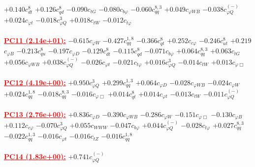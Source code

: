 \documentclass{article}
\begin{document}
{$+0.140$}{\rm $c_{dt}^{8}$} 
{$+0.126$}{\rm $c_{qd}^{8}$} 
{$-0.090$}{\rm $c_{tG}$} 
{$-0.080$}{\rm $c_{b \varphi}$} 
{$-0.060$}{\rm $c_{qq}^{8,3}$} 
{$+0.049$}{\rm $c_{\varphi WB}$} 
{$-0.038$}{\rm $c_{\varphi Q}^{(-)}$} 
{$+0.024$}{\rm $c_{\varphi t}$} 
{$-0.018$}{\rm $c_{\varphi Q}^{3}$} 
{$+0.018$}{\rm $c_{tW}$} 
{$-0.012$}{\rm $c_{t \varphi}$} 
 \nonumber \\ \nonumber \\ 
\noindent \textcolor{red}{\underline{\bf{PC11} (2.14e+01):}}
{$-0.615$}{\rm $c_{\varphi W}$} 
{$-0.427$}{\rm $c_{qq}^{1,8}$} 
{$-0.366$}{\rm $c_{qt}^{8}$} 
{$+0.252$}{\rm $c_{c \varphi}$} 
{$-0.246$}{\rm $c_{ut}^{8}$} 
{$+0.219$}{\rm $c_{\varphi B}$} 
{$-0.213$}{\rm $c_{qu}^{8}$} 
{$-0.197$}{\rm $c_{\varphi D}$} 
{$-0.129$}{\rm $c_{dt}^{8}$} 
{$-0.115$}{\rm $c_{qd}^{8}$} 
{$-0.071$}{\rm $c_{b \varphi}$} 
{$+0.064$}{\rm $c_{qq}^{8,3}$} 
{$+0.063$}{\rm $c_{tG}$} 
{$+0.056$}{\rm $c_{\varphi WB}$} 
{$+0.038$}{\rm $c_{\varphi Q}^{(-)}$} 
{$-0.026$}{\rm $c_{\varphi t}$} 
{$-0.021$}{\rm $c_{t \varphi}$} 
{$+0.016$}{\rm $c_{\varphi Q}^{3}$} 
{$-0.014$}{\rm $c_{tW}$} 
{$+0.013$}{\rm $c_{\varphi \Box}$} 
 \nonumber \\ \nonumber \\ 
\noindent \textcolor{red}{\underline{\bf{PC12} (4.19e+00):}}
{$+0.950$}{\rm $c_{\varphi Q}^{3}$} 
{$+0.299$}{\rm $c_{qq}^{1,3}$} 
{$+0.064$}{\rm $c_{\varphi D}$} 
{$-0.028$}{\rm $c_{\varphi WB}$} 
{$-0.024$}{\rm $c_{\varphi W}$} 
{$+0.024$}{\rm $c_{qq}^{1,8}$} 
{$-0.018$}{\rm $c_{qq}^{8,3}$} 
{$-0.016$}{\rm $c_{\varphi \Box}$} 
{$+0.014$}{\rm $c_{qt}^{8}$} 
{$+0.014$}{\rm $c_{\varphi t}$} 
{$-0.013$}{\rm $c_{tW}$} 
{$-0.011$}{\rm $c_{\varphi Q}^{(-)}$} 
 \nonumber \\ \nonumber \\ 
\noindent \textcolor{red}{\underline{\bf{PC13} (2.76e+00):}}
{$+0.836$}{\rm $c_{\varphi D}$} 
{$-0.390$}{\rm $c_{\varphi WB}$} 
{$-0.286$}{\rm $c_{\varphi W}$} 
{$-0.151$}{\rm $c_{\varphi \Box}$} 
{$-0.130$}{\rm $c_{\varphi B}$} 
{$+0.112$}{\rm $c_{c \varphi}$} 
{$-0.070$}{\rm $c_{\varphi Q}^{3}$} 
{$+0.055$}{\rm $c_{WWW}$} 
{$-0.047$}{\rm $c_{b \varphi}$} 
{$+0.044$}{\rm $c_{\varphi Q}^{(-)}$} 
{$-0.028$}{\rm $c_{t \varphi}$} 
{$+0.027$}{\rm $c_{qq}^{8,3}$} 
{$-0.022$}{\rm $c_{qq}^{1,3}$} 
{$-0.016$}{\rm $c_{\varphi t}$} 
{$-0.016$}{\rm $c_{tZ}$} 
{$-0.016$}{\rm $c_{qq}^{1,8}$} 
 \nonumber \\ \nonumber \\ 
\noindent \textcolor{red}{\underline{\bf{PC14} (1.83e+00):}}
{$+0.741$}{\rm $c_{\varphi Q}^{(-)}$} 
\end{document}
